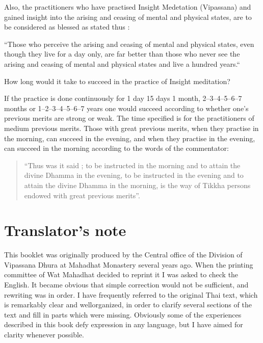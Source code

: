 \documentclass[a5paper,10pt,english]{book}
\begin{document}
\begin{enumerate}
\begin{enumerate}
\sphinxAtStartPar
Also, the practitioners who have practised Insight Medetation (Vipassana) and gained insight into the arising and ceasing of mental and physical states, are to be considered as blessed as stated thus :

\sphinxAtStartPar
{} “Those who perceive the arising and ceasing of mental and physical states, even though they live for a day only, are far better than those who never see the arising and ceasing of mental and physical states and live a hundred years.“

\end{enumerate}

\end{enumerate}

\sphinxAtStartPar
{} How long would it take to succeed in the practice of Insight meditation?

\sphinxAtStartPar
{} If the practice is done continuously for 1 day 15 days 1 month, 2–3–4–5–6–7 months or 1–2–3–4–5–6–7 years one would succeed according to whether one’s previous merits are strong or weak. The time specified is for the practitioners of medium previous merits. Those with great previous merits, when they practise in the morning, can succeed in the evening, and when they practise in the evening, can succeed in the morning according to the words of the commentator:
\begin{quote}

\sphinxAtStartPar
{}

\sphinxAtStartPar
“Thus was it said ; to be instructed in the morning and to attain the divine Dhamma in the evening, to be instructed in the evening and to attain the divine Dhamma in the morning, is the way of Tikkha persons endowed with great previous merits”.
\end{quote}

\sphinxAtStartPar
{}


\section{Translator’s note}
\label{\detokenize{practice:translator-s-note}}
\sphinxAtStartPar
This booklet was originally produced by the Central office of the Division of Vipassana Dhura at Mahadhat Monastery several years ago. When the printing committee of Wat Mahadhat decided to reprint it I was asked to check the English. It became obvious that simple correction would not be sufficient, and rewriting was in order. I have frequently referred to the original Thai text, which is remarkably clear and well\sphinxhyphen{}organized, in order to clarify several sections of the text and fill in parts which were missing. Obviously some of the experiences described in this book defy expression in any language, but I have aimed for clarity whenever possible.
\end{document}
